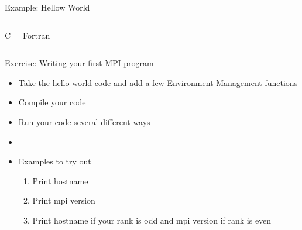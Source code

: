 \documentclass[9pt,c]{beamer}
\begin{document}


\begin{frame}[fragile]{Example: Hellow World}
  \begin{columns}
    \vspace{-0.5cm}
    \begin{exampleblock}{C}
      
    \end{exampleblock}
    \vspace{-0.5cm}
    \begin{exampleblock}{Fortran}
      
    \end{exampleblock}
  \end{columns}
\end{frame}

\begin{frame}{Exercise: Writing your first MPI program}
  \begin{itemize}
    \item Take the hello world code and add a few Environment Management functions
    \item Compile your code
    \item Run your code several different ways
    \item[]
    \item Examples to try out
      \begin{enumerate}
        \item Print hostname
        \item Print mpi version
        \item Print hostname if your rank is odd and mpi version if rank is even 
      \end{enumerate}
  \end{itemize}
\end{frame}
\end{document}
